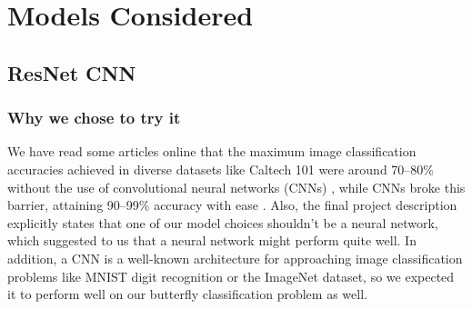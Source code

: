 \documentclass[10pt]{article} %
\begin{document}
\section{Models Considered}
\subsection{ResNet CNN}
\subsubsection{Why we chose to try it}
We have read some articles online that the maximum image classification accuracies achieved in diverse datasets like Caltech 101 were around 70--80\% without the use of convolutional neural networks (CNNs) \cite{svmacc}, while CNNs broke this barrier, attaining 90--99\% accuracy with ease \cite{imagenet, Zabir_Fazira_Ibrahim_Sabri_2018}. Also, the final project description explicitly states that one of our model choices shouldn't be a neural network, which suggested to us that a neural network might perform quite well. In addition, a CNN is a well-known architecture for approaching image classification problems like MNIST digit recognition or the ImageNet dataset, so we expected it to perform well on our butterfly classification problem as well.
\end{document}
